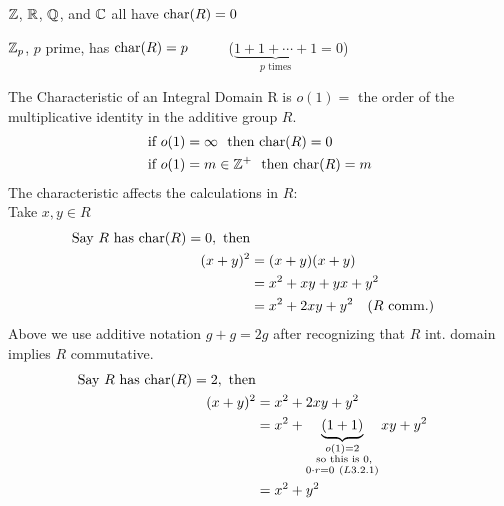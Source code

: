 \begin{example}
    ${\mathbb{Z}}$, ${\mathbb{R}}$, ${\mathbb{Q}}$, and ${\mathbb{C}}$ all have $\text{char}(R)=0$
\end{example}
\newpage
\begin{example}
    ${\mathbb{Z}}_p$, $p$ prime, has $\text{char}(R)=p$
    \ \ \ \ \ ($\underbrace{1+1+\cdots +1}_{p \text{ times}} = 0$)
\end{example}
\noindent The Characteristic of an Integral Domain R is $o(1)=$ the order of the multiplicative
identity in the additive group $R$.
\begin{align}
    \text{if }o(1)&=\infty \ \text{ then }\text{char}(R)=0 \nonumber \\
    \text{if }o(1)&=m\in {\mathbb{Z}}^{+} \ \text{ then }\text{char}(R)=m \nonumber
\end{align}
The characteristic affects the calculations in $R$: \\
Take $x,y\in R$
\begin{align}
    \text{Say }R \text{ has }\text{char}(R)=0, \text{ then} \nonumber \\
    (x+y)^2 &= (x+y)(x+y) \nonumber \\
    &= x^2+xy+yx+y^2 \nonumber \\
    &= x^2 + 2xy + y^2  \ \ \ (R\text{ comm.}) \nonumber
\end{align}
Above we use additive notation $g+g=2g$ after recognizing that $R$ int. domain implies $R$
commutative.
\begin{align}
    \text{Say }R \text{ has }\text{char}(R)=2, \text{ then} \nonumber \\
    (x+y)^2 &= x^2 + 2xy + y^2  \nonumber \\
    &= x^2+\underbrace{(1+1)}_{\substack{o(1)=2 \\ \text{ so this is }0, \\ 0\cdot r = 0 \ (L3.2.1)}}xy+y^2 \nonumber \\
    &= x^2+y^2 \nonumber
\end{align}

